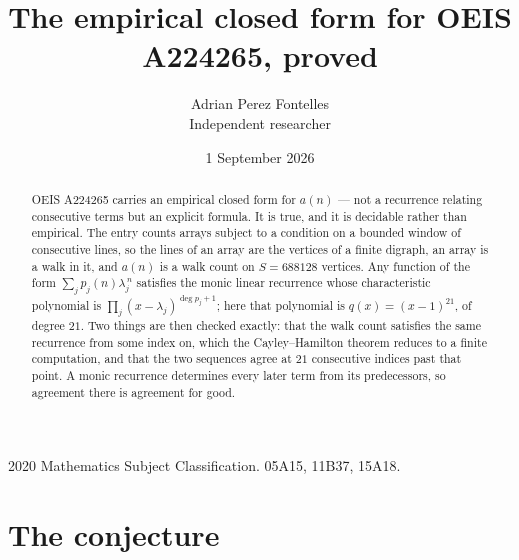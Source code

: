 \documentclass[11pt,a4paper]{article}
\title{The empirical closed form for OEIS A224265, proved}
\author{Adrian Perez Fontelles\\ \small Independent researcher}
\date{1 September 2026}
\theoremstyle{plain}
\theoremstyle{definition}
\begin{document}
\maketitle

\begin{abstract}
OEIS A224265 carries an empirical closed form for $a(n)$ --- not a recurrence relating
consecutive terms but an explicit formula. It is true, and it is decidable rather than
empirical. The entry counts arrays subject to a condition on a bounded window of consecutive lines, so the lines of an array are the
vertices of a finite digraph, an array is a walk in it, and $a(n)$ is a walk count on
$S=688128$ vertices. Any function of the form $\sum_j p_j(n)\lambda_j^{\,n}$ satisfies the
monic linear recurrence whose characteristic polynomial is
$\prod_j(x-\lambda_j)^{\deg p_j+1}$; here that polynomial is $q(x)=(x-1)^{21}$, of degree
$21$. Two things are then checked exactly: that the walk count satisfies the same
recurrence from some index on, which the Cayley--Hamilton theorem reduces to a finite
computation, and that the two sequences agree at $21$ consecutive indices past that
point. A monic recurrence determines every later term from its predecessors, so agreement
there is agreement for good.
\end{abstract}

\noindent\small 2020 Mathematics Subject Classification. 05A15, 11B37, 15A18.\normalsize

\section{The conjecture}
\end{document}
